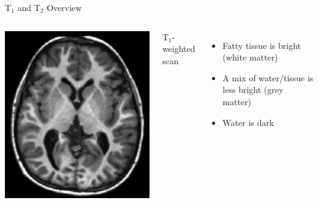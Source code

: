 \documentclass[aspectratio=169,xcolor=dvipsnames]{beamer}
\begin{document}
\begin{frame}{T$_{1}$ and T$_{2}$ Overview}
\begin{columns}[c]
\begin{center}
\includegraphics[width=.8\textwidth]{imgs/t1brain}
\end{center}

T$_{1}$-weighted scan
\begin{itemize}
\item Fatty tissue is bright (white matter)
\item A mix of water/tissue is less bright (grey matter)
\item Water is dark
\end{itemize}
\end{columns}

\end{frame}

\end{document}
